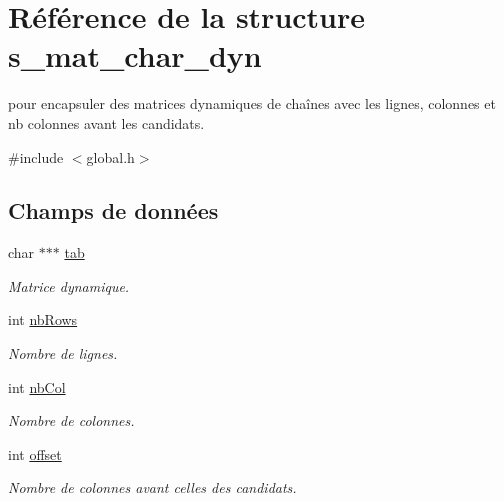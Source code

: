 \hypertarget{structs__mat__char__dyn}{}\section{Référence de la structure s\+\_\+mat\+\_\+char\+\_\+dyn}
\label{structs__mat__char__dyn}


pour encapsuler des matrices dynamiques de chaînes avec les lignes, colonnes et nb colonnes avant les candidats.  




{\ttfamily \#include $<$global.\+h$>$}

\subsection*{Champs de données}
\begin{DoxyCompactItemize}
\item 
\mbox{\label{structs__mat__char__dyn_aed543834b9d320f54b8e095f2bcb254c}} 
char $\ast$$\ast$$\ast$ \mbox{\hyperlink{structs__mat__char__dyn_aed543834b9d320f54b8e095f2bcb254c}{tab}}
\begin{DoxyCompactList}\small\item\em Matrice dynamique. \end{DoxyCompactList}\item 
\mbox{\label{structs__mat__char__dyn_a79216b74e382c29c63ee9be03b8eda5f}} 
int \mbox{\hyperlink{structs__mat__char__dyn_a79216b74e382c29c63ee9be03b8eda5f}{nb\+Rows}}
\begin{DoxyCompactList}\small\item\em Nombre de lignes. \end{DoxyCompactList}\item 
\mbox{\label{structs__mat__char__dyn_a6469383d7383132548299002f54d4524}} 
int \mbox{\hyperlink{structs__mat__char__dyn_a6469383d7383132548299002f54d4524}{nb\+Col}}
\begin{DoxyCompactList}\small\item\em Nombre de colonnes. \end{DoxyCompactList}\item 
\mbox{\label{structs__mat__char__dyn_aed7ea92f45bd273dde380a45ddced592}} 
int \mbox{\hyperlink{structs__mat__char__dyn_aed7ea92f45bd273dde380a45ddced592}{offset}}
\begin{DoxyCompactList}\small\item\em Nombre de colonnes avant celles des candidats. \end{DoxyCompactList}\end{DoxyCompactItemize}



